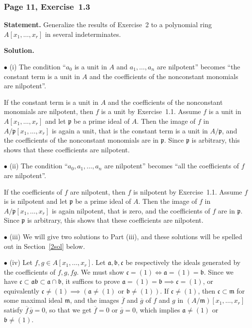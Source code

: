 \documentclass[12pt,letterpaper]{article}%
\newcommand{\mf}{\mathfrak}
\newcommand{\aaa}{\mf a}
\newcommand{\bbb}{\mf b}
\newcommand{\ccc}{\mf c}
\newcommand{\mmm}{\mf m}
\newcommand{\ppp}{\mf p}
\newcommand{\bu}{\bullet}
\newcommand{\nn}{\noindent}
\begin{document}
\subsubsection{Page 11, Exercise~1.3}%

\textbf{Statement.} Generalize the results of Exercise~2 to a polynomial ring $A[x_1,\ldots,x_r]$ in several indeterminates.

\nn\textbf{Solution.} 

\nn$\bu$ (i) The condition ``$a_0$ is a unit in $A$ and $a_1,\ldots,a_n$ are nilpotent'' becomes ``the constant term is a unit in $A$ and the coefficients of the nonconstant monomials are nilpotent''.

If the constant term is a unit in $A$ and the coefficients of the nonconstant monomials are nilpotent, then $f$ is a unit by Exercise~1.1. Assume $f$ is a unit in $A[x_1,\ldots,x_r]$ and let $\ppp$ be a prime ideal of $A$. Then the image of $f$ in $A/\ppp[x_1,\ldots,x_r]$ is again a unit, that is the constant term is a unit in $A/\ppp$, and the coefficients of the nonconstant monomials are in $\ppp$. Since $\ppp$ is arbitrary, this shows that these coefficients are nilpotent.

\nn$\bu$ (ii) The condition ``$a_0,a_1,\ldots,a_n$ are nilpotent'' becomes ``all the coefficients of $f$ are nilpotent''.

If the coefficients of $f$ are nilpotent, then $f$ is nilpotent by Exercise~1.1. Assume $f$ is is nilpotent and let $\ppp$ be a prime ideal of $A$. Then the image of $f$ in $A/\ppp[x_1,\ldots,x_r]$ is again nilpotent, that is zero, and the coefficients of $f$ are in $\ppp$. Since $\ppp$ is arbitrary, this shows that these coefficients are nilpotent.


\nn$\bu$ (iii) We will give two solutions to Part (iii), and these solutions will be spelled out in Section~\ref{2sol} below.

\nn$\bu$ (iv) Let $f,g\in A[x_1,\ldots,x_r]$. Let $\aaa,\bbb,\ccc$ be respectively the ideals generated by the coefficients of $f,g,fg$. We must show $\ccc=(1)\iff\aaa=(1)=\bbb$. Since we have $\ccc\subset\aaa\bbb\subset\aaa\cap\bbb$, it suffices to prove $\aaa=(1)=\bbb\implies\ccc=(1)$, or equivalently $\ccc\ne(1)\implies(\aaa\ne(1)\text{ or }\bbb\ne(1))$. If $\ccc\ne(1)$, then $\ccc\subset\mmm$ for some maximal ideal $\mmm$, and the images $\overline f$ and $\overline g$ of $f$ and $g$ in $(A/\mmm)[x_1,\ldots,x_r]$ satisfy $\overline f\,\overline g=0$, so that we get $\overline f=0$ or $\overline g=0$, which implies $\aaa\ne(1)$ or $\bbb\ne(1)$.
\end{document}
